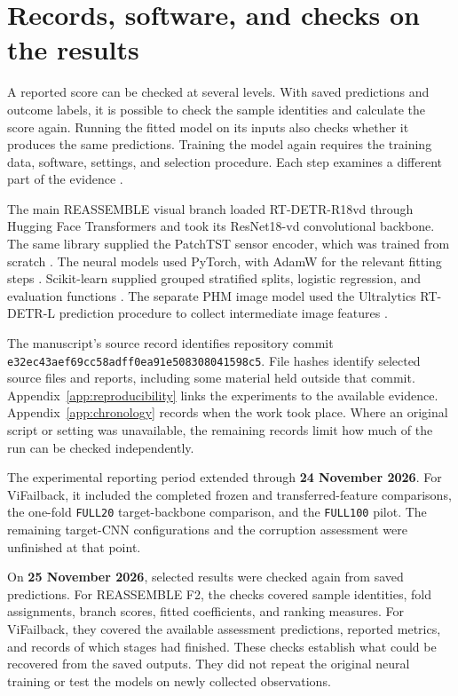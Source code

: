 \section{Records, software, and checks on the results}
\label{sec:ch4-reproducibility}

A reported score can be checked at several levels. With saved predictions and outcome
labels, it is possible to check the sample identities and calculate the score again.
Running the fitted model on its inputs also checks whether it produces the same
predictions. Training the model again requires the training data, software, settings,
and selection procedure. Each step examines a different part of the evidence
\parencite{P009}.

The main REASSEMBLE visual branch loaded RT-DETR-R18vd through Hugging Face Transformers
and took its ResNet18-vd convolutional backbone. The same library supplied the PatchTST
sensor encoder, which was trained from scratch \parencite{Wolf2020Transformers}. The
neural models used PyTorch, with AdamW for the relevant fitting steps
\parencite{Paszke2019PyTorch}. Scikit-learn supplied grouped stratified splits, logistic
regression, and evaluation functions \parencite{Pedregosa2011ScikitLearn}. The separate
PHM image model used the Ultralytics RT-DETR-L prediction procedure to collect
intermediate image features \parencite{UltralyticsRTDETR}.

The manuscript’s source record identifies repository commit
\texttt{e32ec43aef69cc58adff0ea91e508308041598c5}. File hashes identify selected source
files and reports, including some material held outside that commit.
Appendix~\ref{app:reproducibility} links the experiments to the available evidence.
Appendix~\ref{app:chronology} records when the work took place. Where an original script
or setting was unavailable, the remaining records limit how much of the run can be
checked independently.

The experimental reporting period extended through \textbf{24 November 2026}. For
ViFailback, it included the completed frozen and transferred-feature comparisons, the
one-fold \texttt{FULL20} target-backbone comparison, and the \texttt{FULL100} pilot. The
remaining target-CNN configurations and the corruption assessment were unfinished at
that point.

On \textbf{25 November 2026}, selected results were checked again from saved
predictions. For REASSEMBLE F2, the checks covered sample identities, fold assignments,
branch scores, fitted coefficients, and ranking measures. For ViFailback, they covered
the available assessment predictions, reported metrics, and records of which stages had
finished. These checks establish what could be recovered from the saved outputs. They
did not repeat the original neural training or test the models on newly collected
observations.

